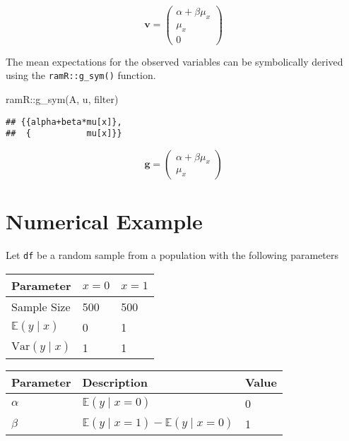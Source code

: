 \documentclass[
]{book}
\newenvironment{Shaded}{\begin{snugshade}}{\end{snugshade}}
\newcommand{\FunctionTok}[1]{\textcolor[rgb]{0.00,0.00,0.00}{#1}}
\newcommand{\NormalTok}[1]{#1}
\newcommand{\SpecialCharTok}[1]{\textcolor[rgb]{0.00,0.00,0.00}{#1}}
\theoremstyle{definition}
\theoremstyle{definition}
\theoremstyle{definition}
\theoremstyle{remark}
\begin{document}
\begin{equation*}\mathbf{v} =\left( \begin{array}{c} \alpha  + \beta  \mu  _{x} \\ \mu  _{x} \\ 0 \end{array} \right)\end{equation*}

The mean expectations for the observed variables
can be symbolically derived using the \texttt{ramR::g\_sym()} function.

\begin{Shaded}
\begin{Highlighting}[]
\NormalTok{ramR}\SpecialCharTok{::}\FunctionTok{g\_sym}\NormalTok{(A, u, filter)}
\end{Highlighting}
\end{Shaded}

\begin{verbatim}
## {{alpha+beta*mu[x]},
##  {           mu[x]}}
\end{verbatim}

\begin{equation*}\mathbf{g} =\left( \begin{array}{c} \alpha  + \beta  \mu  _{x} \\ \mu  _{x} \end{array} \right)\end{equation*}

\hypertarget{numerical-example}{%
\section{Numerical Example}\label{numerical-example}}

Let \texttt{df} be a random sample from a population with the following parameters

\begin{tabular}{l|l|l}
\hline
Parameter & $x = 0$ & $x = 1$\\
\hline
Sample Size & 500 & 500\\
\hline
$\mathbb{E} \left( y \mid x \right)$ & 0 & 1\\
\hline
$\mathrm{Var} \left( y \mid x \right)$ & 1 & 1\\
\hline
\end{tabular}

\begin{tabular}{l|l|l}
\hline
Parameter & Description & Value\\
\hline
$\alpha$ & $\mathbb{E} \left( y \mid x = 0 \right)$ & 0\\
\hline
$\beta$ & $\mathbb{E} \left( y \mid x = 1 \right) - \mathbb{E} \left( y \mid x = 0 \right)$ & 1\\
\hline
\end{tabular}
\end{document}

